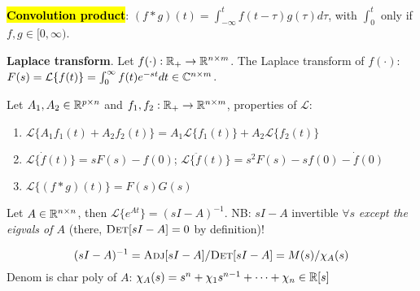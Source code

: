 \begin{Definition}
\textbf{\hl{Convolution product}}: $(f\ast g)(t)=\int_{-\infty}^t f(t-\tau)g(\tau)d\tau$, with $\int_0^t$ only if $f,g\in [0,\infty)$.

\textbf{Laplace transform}.
Let $f(\cdot):\mathbb R_+\to\mathbb R^{n\times m}$. The Laplace transform of $f(\cdot)$: $F(s)=\mathcal L\{f(t)\}=\int_0^\infty f(t)e^{-st}dt\in\mathbb C^{n\times m}$.

Let $A_1,A_2\in\mathbb R^{p\times n}$ and $f_1,f_2:\mathbb R_+\to\mathbb R^{n\times m}$, properties of $\mathcal L$:
\begin{enumerate}[leftmargin=*]
  \item $\mathcal L\{A_1f_1(t)+A_2f_2(t)\}=A_1\mathcal L\{f_1(t)\}+A_2\mathcal L\{f_2(t)\}$
  \item $\mathcal L\{\dot f(t)\}=sF(s)-f(0)$; $\mathcal L\{\ddot f(t)\}=s^2F(s)-sf(0)-\dot f(0)$
  \item $\mathcal L\{(f\ast g)(t)\}=F(s)G(s)$
\end{enumerate}
\end{Definition}
\begin{Theorem}
Let $A\in\mathbb R^{n\times n}$, then $\mathcal L\{e^{At}\}=(sI-A)^{-1}$. NB: $sI-A$ invertible $\forall s$ \textit{except the eigvals of $A$} (there, $\textsc{Det}[sI-A]=0$ by definition)! 
\end{Theorem}
\vspace{-2mm}
\begin{equation*}
(sI-A)^{-1}=\textsc{Adj}[sI-A]/\textsc{Det}[sI-A]=M(s)/\chi_A(s)
\end{equation*}
Denom is char poly of $A$: $\chi_A(s)=s^n+\chi_1 s^{n-1}+\cdots+\chi_n\in\mathbb R[s]$

